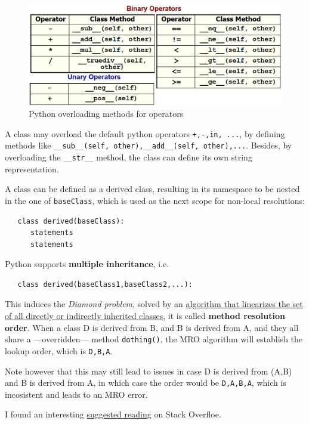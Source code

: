 \begin{paracol}{2}
   \switchcolumn
   \begin{figure}[htbp]
      \centering
      \includegraphics{images/python_overloading.png}
      \caption{Python overloading methods for operators}
      \label{fig:python_overloading}
   \end{figure}
\end{paracol}
A class may overload the default python operators \lstinline|+,-,in, ...|,
by defining methods like \lstinline|__sub__(self, other),__add__(self, other),...|.
Besides, by overloading the \lstinline|__str__| method, the class can define its own string representation.


A class can be defined as a derived class, resulting in its namespace to be nested in the one of \lstinline|baseClass|, which is used as the next scope for non-local resolutions:  
\begin{lstlisting}
   class derived(baseClass):
      statements
      statements
\end{lstlisting}
Python supports \textbf{multiple inheritance}, i.e.
\begin{lstlisting}
   class derived(baseClass1,baseClass2,...):
\end{lstlisting}
This induces the \textit{Diamond problem}, solved by an \href{https://www.python.org/download/releases/2.3/mro/}{algorithm that linearizes the set of all directly or indirectly inherited classes}, it is called \textbf{method resolution order}.
When a class D is derived from B, and B is derived from A, and they all share a ---overridden--- method \lstinline|dothing()|, the MRO algorithm will establish the lookup order, which is \lstinline|D,B,A|.

Note however that this may still lead to issues in case D is derived from (A,B) and B is derived from A, in which case the order would be \lstinline|D,A,B,A|, which is incosistent and leads to an MRO error.

I found an interesting \href{https://stackoverflow.com/questions/56361048/what-is-the-diamond-problem-in-python-and-why-its-not-appear-in-python2}{suggested reading}
on Stack Overfloe.




